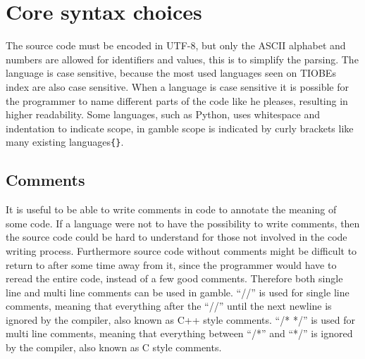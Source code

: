 \section{Core syntax choices}
The source code must be encoded in UTF-8, but only the ASCII alphabet and numbers are allowed for identifiers and values, this is to simplify the parsing. 
The language is case sensitive, because the most used languages seen on TIOBEs index\citep{TIOBE} are also case sensitive.
When a language is case sensitive it is possible for the programmer to name different parts of the code like he pleases, resulting in higher readability. 
Some languages, such as Python, uses whitespace and indentation to indicate scope, in \gls{gamble} scope is indicated by curly brackets like many existing languages\texttt{\{\}}.  

\subsection*{Comments}
It is useful to be able to write comments in code to annotate the meaning of some code.
If a language were not to have the possibility to write comments, then the source code could be hard to understand for those not involved in the code writing process.
Furthermore source code without comments might be difficult to return to after some time away from it, since the programmer would have to reread the entire code, instead of a few good comments.\citep{Commenting}
Therefore both single line and multi line comments can be used in \gls{gamble}. 
``//'' is used for single line comments, meaning that everything after the ``//'' until the next newline is ignored by the compiler, also known as C++ style comments. 
``/* */'' is used for multi line comments, meaning that everything between ``/*'' and ``*/'' is ignored by the compiler, also known as C style comments. 

